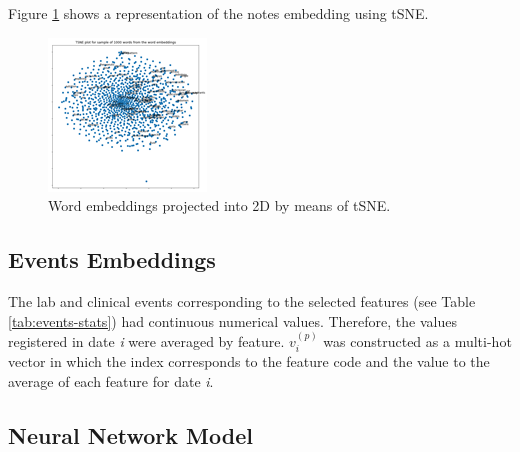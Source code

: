 \documentclass{sigkddExp}
\begin{document}
Figure \ref{fig:tSNE} shows a representation of the notes embedding using tSNE.

\graphicspath{ {figures/} } 
\begin{figure}\centering
\includegraphics[width=1\columnwidth]{tSNE.png}
\caption{Word embeddings projected into 2D by means of tSNE.}
\label{fig:tSNE}
\end{figure}

\subsection{Events Embeddings}
The lab and clinical events corresponding to the selected features (see Table \ref{tab:events-stats})
had continuous numerical values. Therefore, the values registered in date \textit{i}
were averaged by feature. $\mathit v_i^{(p)}$ was constructed as a multi-hot vector in which
the index corresponds to the feature code and the value to the average of each feature for date \textit{i}.

\subsection{Neural Network Model}
\end{document}
